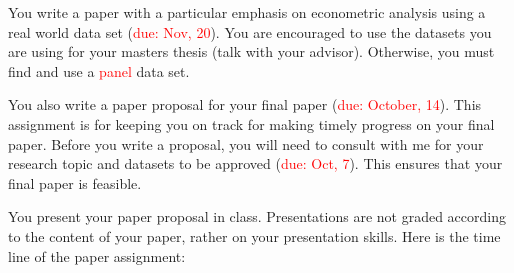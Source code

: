 \documentclass[12pt]{article}
\begin{document}
\begin{itemize}
	You write a paper with a particular emphasis on econometric analysis using a real world data set (\textcolor{red}{due: Nov, 20}). You are encouraged to use the datasets you are using for your masters thesis (talk with your advisor). Otherwise, you must find and use a \textcolor{red}{panel} data set. 

	You also write a paper proposal for your final paper (\textcolor{red}{due: October, 14}). This assignment is for keeping you on track for making timely progress on your final paper. Before you write a proposal, you will need to consult with me for your research topic and datasets to be approved (\textcolor{red}{due: Oct, 7}). This ensures that your final paper is feasible.  

	You present your paper proposal in class. Presentations are not graded according to the content of your paper, rather on your presentation skills. Here is the time line of the paper assignment:

\end{itemize}

\vspace*{.15in}

\clearpage
\end{document}
